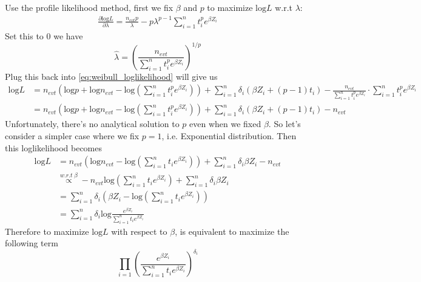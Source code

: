 \documentclass[a4paper,12pt]{article}
\begin{document}
Use the profile likelihood method, first we fix $\beta$ and $p$ to maximize $\mathrm{log}L$ w.r.t $\lambda$:
\[
  \begin{aligned}
    \frac{\partial\mathrm{log}L}{\partial \lambda}
    = \frac{n_{evt}p}{\lambda}
    - p\lambda^{p - 1}\sum\limits_{i = 1}^nt_i^pe^{\beta Z_i}
  \end{aligned}
\]
Set this to 0 we have
\[
  \hat{\lambda} = \left(
    \frac{n_{evt}}{\sum\limits_{i = 1}^nt_i^pe^{\beta Z_i}}
  \right)^{1 / p}
\]
Plug this back into \eqref{eq:weibull_loglikelihood} will give us
\[
  \begin{aligned}
    \mathrm{log}L
    &= n_{evt}\left(
      \mathrm{log}p + \mathrm{log}n_{evt}
      - \mathrm{log}\left(\sum\limits_{i = 1}^nt_i^pe^{\beta Z_i}\right)
      \right)
      + \sum\limits_{i = 1}^n\delta_i\left(\beta Z_i + \left(p - 1\right)t_i\right)
      - \frac{n_{evt}}{\sum\limits_{i = 1}^nt_i^pe^{\beta Z_i}} \cdot \sum\limits_{i = 1}^nt_i^pe^{\beta Z_i}    \\
    &= n_{evt}\left(
      \mathrm{log}p + \mathrm{log}n_{evt}
      - \mathrm{log}\left(\sum\limits_{i = 1}^nt_i^pe^{\beta Z_i}\right)
      \right)
      + \sum\limits_{i = 1}^n\delta_i\left(\beta Z_i + \left(p - 1\right)t_i\right)
      - n_{evt}
  \end{aligned} 
\]
Unfortunately, there's no analytical solution to $p$ even when we fixed $\beta$. So let's consider a simpler case where we fix $p = 1$, i.e. Exponential distribution. Then this loglikelihood becomes
\[
  \begin{aligned}
    \mathrm{log}L
    &= n_{evt}\left(
      \mathrm{log}n_{evt}
      - \mathrm{log}\left(\sum\limits_{i = 1}^nt_ie^{\beta Z_i}\right)
      \right)
      + \sum\limits_{i = 1}^n\delta_i\beta Z_i
      - n_{evt}    \\
    &\overset{w.r.t\; \beta}{\propto}
      -n_{evt}\mathrm{log}\left(\sum\limits_{i = 1}^nt_ie^{\beta Z_i}\right)
      +  \sum\limits_{i = 1}^n\delta_i\beta Z_i    \\
    &= \sum\limits_{i = 1}^n\delta_i\left(
      \beta Z_i - \mathrm{log}\left(\sum\limits_{i = 1}^nt_ie^{\beta Z_i}\right)
      \right)    \\
    &= \sum\limits_{i = 1}^n\delta_i\mathrm{log}
      \frac{e^{\beta Z_i}}{\sum\limits_{i = 1}^nt_ie^{\beta Z_i}}
  \end{aligned}
\]
Therefore to maximize $\mathrm{log}L$ with respect to $\beta$, is equivalent to maximize the following term
\begin{equation}
  \label{eq:beta_mle_objective}
  \prod\limits_{i = 1}\left(
    \frac{e^{\beta Z_i}}{\sum\limits_{i = 1}^nt_ie^{\beta Z_i}}
  \right)^{\delta_i}
\end{equation}
\end{document}

